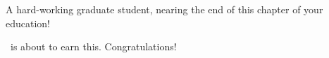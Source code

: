 \tableofcontents   %

\listoftables      %
\listoffigures     %
\listofillustrations     %
\listofmaps      %
\listofslides    %


%
%















% 



%
\appendices



\begin{glossary}
\begin{description}
    \item[\theauthor] A hard-working graduate student, nearing the end of this chapter of your education!
    \item[\thedegree] \theauthor\ is about to earn this. Congratulations!
\end{description}
\end{glossary}




